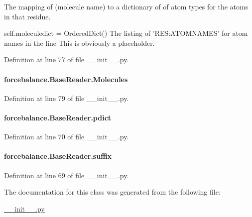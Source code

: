 The mapping of (molecule name) to a dictionary of of atom types for the atoms in that residue. 

self.\-moleculedict = Ordered\-Dict() The listing of 'R\-E\-S\-:A\-T\-O\-M\-N\-A\-M\-E\-S' for atom names in the line This is obviously a placeholder. 

Definition at line 77 of file \-\_\-\-\_\-init\-\_\-\-\_\-.\-py.

\hypertarget{classforcebalance_1_1BaseReader_a4369b5fb663a83b11602daa71db6862e}{
\paragraph[{Molecules}]{\setlength{\rightskip}{0pt plus 5cm}forcebalance.\-Base\-Reader.\-Molecules}}\label{classforcebalance_1_1BaseReader_a4369b5fb663a83b11602daa71db6862e}


Definition at line 79 of file \-\_\-\-\_\-init\-\_\-\-\_\-.\-py.

\hypertarget{classforcebalance_1_1BaseReader_aaf18c900d6055ed4b5124f6bb26164c1}{
\paragraph[{pdict}]{\setlength{\rightskip}{0pt plus 5cm}forcebalance.\-Base\-Reader.\-pdict}}\label{classforcebalance_1_1BaseReader_aaf18c900d6055ed4b5124f6bb26164c1}


Definition at line 70 of file \-\_\-\-\_\-init\-\_\-\-\_\-.\-py.

\hypertarget{classforcebalance_1_1BaseReader_a48ef0584a1b6b4b6f8eb741ad8465db8}{
\paragraph[{suffix}]{\setlength{\rightskip}{0pt plus 5cm}forcebalance.\-Base\-Reader.\-suffix}}\label{classforcebalance_1_1BaseReader_a48ef0584a1b6b4b6f8eb741ad8465db8}


Definition at line 69 of file \-\_\-\-\_\-init\-\_\-\-\_\-.\-py.



The documentation for this class was generated from the following file\-:\begin{DoxyCompactItemize}
\item 
\hyperlink{____init_____8py}{\-\_\-\-\_\-init\-\_\-\-\_\-.\-py}\end{DoxyCompactItemize}
